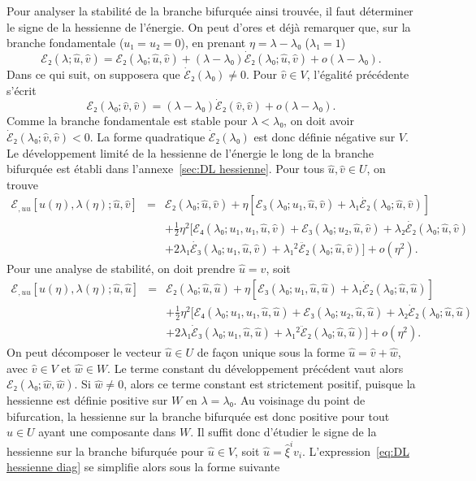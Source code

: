\documentclass[12pt, final]{amsart}
\theoremstyle{definition}
\begin{document}
Pour analyser la stabilité de la branche bifurquée ainsi trouvée,
il faut déterminer le signe de la hessienne de l'énergie. On peut
d'ores et déjà remarquer que, sur la branche fondamentale ($u₁ = u₂
= 0$), en prenant $η = λ - λ₀$ ($λ₁ = 1$)
\begin{equation}
  ℰ₂ (λ ; \hat{u}, \hat{v}) =ℰ₂ (λ₀ ;
  \hat{u}, \hat{v}) + (λ - λ₀)  \dot{ℰ}₂ (λ₀ ;
  \hat{u}, \hat{v}) + o (λ - λ₀) .
\end{equation}
Dans ce qui suit, on supposera que $\dot{ℰ}₂ (λ₀) \neq 0$.
Pour $\hat{v}∈V$, l'égalité précédente s'écrit
\begin{equation}
  ℰ₂ (λ₀ ; \hat{v}, \hat{v}) = (λ - λ₀)
  \dot{ℰ}₂ (\hat{v}, \hat{v}) + o (λ - λ₀) .
\end{equation}
Comme la branche fondamentale est stable pour $λ < λ₀$, on doit
avoir $\dot{ℰ}₂ (λ₀ ; \hat{v}, \hat{v}) < 0$. La forme
quadratique $\dot{ℰ}₂ (λ₀)$ est donc définie
négative sur $V$. Le développement limité de la hessienne de
l'énergie le long de la branche bifurquée est établi dans
l'annexe~\ref{sec:DL hessienne}. Pour tous $\hat{u}, \hat{v}∈U$, on trouve
\begin{eqnarray}
  ℰ_{, u  u} [u (η), λ (η) ; \hat{u}, \hat{v}] &
  = & ℰ₂ (λ₀ ; \hat{u}, \hat{v}) + η [ℰ₃
  (λ₀ ; u₁, \hat{u}, \hat{v})   + λ₁
  \dot{ℰ₂} (λ₀ ; \hat{u}, \hat{v})] \nonumber\\
  &  &  + \tfrac{1}{2} η^2  [ℰ₄ (λ₀ ; u₁, u₁,
  \hat{u}, \hat{v})  +ℰ₃ (λ₀ ; u₂, \hat{u},
  \hat{v}) + λ₂  \dot{ℰ₂} (λ₀ ; \hat{u}, \hat{v})
  \nonumber\\
  &  &  + 2 λ₁  \dot{ℰ₃} (λ₀ ; u₁,
  \hat{u}, \hat{v}) + λ₁^2  \ddot{ℰ₂} (λ₀ ; \hat{u},
  \hat{v}) ] + o (η^2) .  \label{eq:DL hessienne}
\end{eqnarray}
Pour une analyse de stabilité, on doit prendre $\hat{u} = \hat{v}$, soit
\begin{eqnarray}
  ℰ_{, u  u} [u (η), λ (η) ; \hat{u}, \hat{u}] &
  = & ℰ₂ (λ₀ ; \hat{u}, \hat{u}) + η [ℰ₃
  (λ₀ ; u₁, \hat{u}, \hat{u}) + λ₁  \dot{ℰ}₂
  (λ₀ ; \hat{u}, \hat{u})] \nonumber\\
  &  & + \tfrac{1}{2} η^2  [ℰ₄ (λ₀ ; u₁, u₁, \hat{u},
  \hat{u}) +ℰ₃ (λ₀ ; u₂, \hat{u}, \hat{u}) + λ₂
  \dot{ℰ}₂ (λ₀ ; \hat{u}, \hat{u})  \nonumber\\
  &  & +  2 λ₁  \dot{ℰ}₃ (λ₀ ; u₁,
  \hat{u}, \hat{u}) + λ₁^2  \ddot{ℰ}₂ (λ₀ ; \hat{u},
  \hat{u})] + o (η^2) .  \label{eq:DL hessienne diag}
\end{eqnarray}
On peut décomposer le vecteur $\hat{u}∈U$ de fa{\c c}on unique sous la
forme $\hat{u} = \hat{v} + \hat{w}$, avec $\hat{v}∈V$ et $\hat{w}∈W$.
Le terme constant du développement précédent vaut alors
$ℰ₂ (λ₀ ; \hat{w}, \hat{w})$. Si $\hat{w} \neq 0$, alors ce
terme constant est strictement positif, puisque la hessienne est définie
positive sur $W$ en $λ = λ₀$. Au voisinage du point de
bifurcation, la hessienne sur la branche bifurquée est donc positive pour
tout $\hat{u}∈U$ ayant une composante dans $W$. Il suffit donc
d'étudier le signe de la hessienne sur la branche bifurquée pour
$\hat{u}∈V$, soit $\hat{u} = \hat{ξ}^i v_i$. L'expression~\eqref{eq:DL
hessienne diag} se simplifie alors sous la forme suivante
\end{document}
